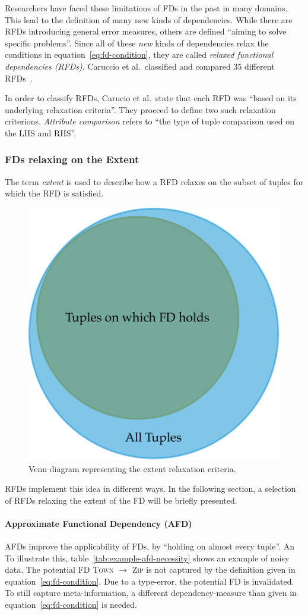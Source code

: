 Researchers have faced these limitations of FDs in the past in many domains.
This lead to the definition of many new kinds of dependencies.
While there are RFDs introducing general error measures, others are defined ``aiming to solve specific problems''\cite[p.~147]{CAR16}.
Since all of these \emph{new} kinds of dependencies relax the conditions in equation~\ref{eq:fd-condition}, they are called \emph{relaxed functional dependencies (RFDs)}.
Caruccio et al.\ classified and compared 35 different RFDs~\cite[p.~151]{CAR16}.

In order to classify RFDs, Carucio et al.\ state that each RFD was ``based on its underlying relaxation criteria''\cite[p.~149]{CAR16}.
They proceed to define two such relaxation criterions.
\emph{Attribute comparison} refers to ``the type of tuple comparison used on the LHS and RHS''.

\subsubsection{FDs relaxing on the Extent}
The term \emph{extent} is used to describe how a RFD relaxes on the subset of tuples for which the RFD is satisfied.

\begin{figure}[h]
     \centering
     \includegraphics[width=.4\textwidth]{images/rfds-extent.pdf}
     \caption{Venn diagram representing the extent relaxation criteria.}
     \label{fig:rfds-extent}
 \end{figure}

RFDs implement this idea in different ways.
In the following section, a selection of RFDs relaxing the extent of the FD will be briefly presented.

\paragraph{Approximate Functional Dependency (AFD)}
AFDs improve the applicability of FDs, by ``holding on almost every tuple''\cite[p.~151]{CAR16}.
An To illustrate this, table~\ref{tab:example-afd-necessity} shows an example of noisy data.
The potential FD \textsc{Town} \(\to\) \textsc{\textsc{Zip}} is not captured by the definition given in equation~\ref{eq:fd-condition}.
Due to a type-error, the potential FD is invalidated.
To still capture meta-information, a different dependency-measure than given in equation~\ref{eq:fd-condition} is needed.

